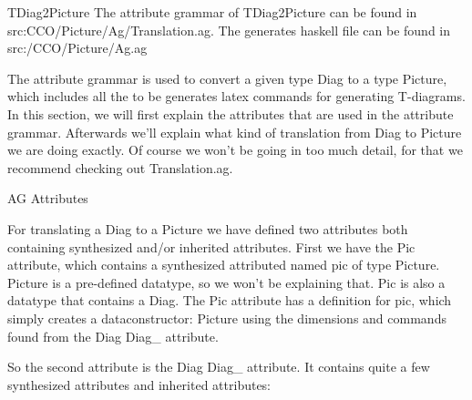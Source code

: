 \documentclass{article}
\begin{document}
\begin{subsection}{TDiag2Picture}
The attribute grammar of TDiag2Picture can be found in src:\/CCO/Picture/Ag/Translation.ag.
The generates haskell file can be found in src:/CCO/Picture/Ag.ag

\hfill \break

The attribute grammar is used to convert a given type Diag to a type Picture, which includes all the to be generates latex commands for generating T-diagrams. In this section, we will first explain the attributes that are used in the attribute grammar. Afterwards we'll explain what kind of translation from Diag to Picture we are doing exactly. Of course we won't be going in too much detail, for that we recommend checking out Translation.ag.

\begin{subsubsection}{AG Attributes}

For translating a Diag to a Picture we have defined two attributes both containing synthesized and/or inherited attributes.
First we have the Pic attribute, which contains a synthesized attributed named pic of type Picture. Picture is a pre-defined datatype, so we won't be explaining that. Pic is also a datatype that contains a Diag. The Pic attribute has a definition for pic, which simply creates a dataconstructor: Picture using the dimensions and commands found from the Diag Diag\_ attribute.

\hfill \break
So the second attribute is the Diag Diag\_ attribute. It contains quite a few synthesized attributes and inherited attributes:


\end{subsubsection}
\end{subsection}
\end{document}
